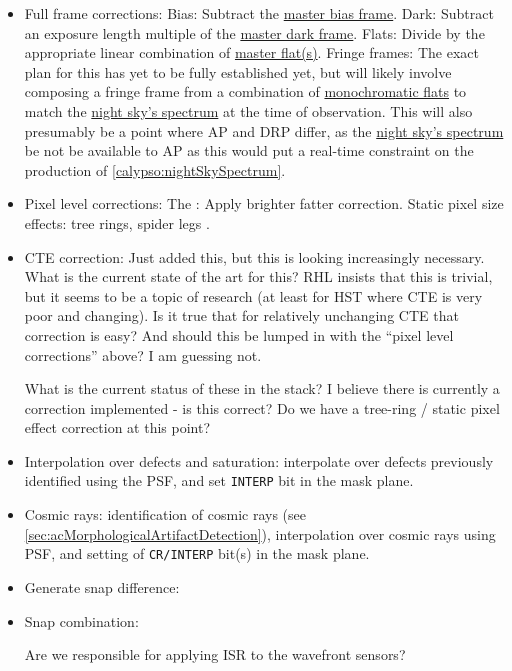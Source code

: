 \begin{itemize}
\item Full frame corrections:
	\subitem Bias: Subtract the \hyperref[calibProducts:bias]{master bias frame}.
	\subitem Dark: Subtract an exposure length multiple of the \hyperref[calibProducts:dark]{master dark frame}.
	\subitem Flats: Divide by the appropriate linear combination of  \hyperref[calibProducts:monoPhotoFlat]{master flat(s)}.
	\subitem Fringe frames: The exact plan for this has yet to be fully established yet, but will likely involve composing a fringe frame from a combination of \hyperref[calibProducts:monoFlat]{monochromatic flats} to match the \hyperref[calypso:nightSkySpectrum]{night sky's spectrum} at the time of observation. This will also presumably be a point where AP and DRP differ, as the \hyperref[calypso:nightSkySpectrum]{night sky's spectrum} be not be available to AP as this would put a real-time constraint on the production of \secsymbol\ref{calypso:nightSkySpectrum}.

\item Pixel level corrections:
	\subitem The \bfeffect: Apply brighter fatter correction. 
	\subitem Static pixel size effects: tree rings, spider legs \etc. 

\item CTE correction: Just added this, but this is looking increasingly necessary. What is the current state of the art for this? RHL insists that this is trivial, but it seems to be a topic of research (at least for HST where CTE is very poor and changing). Is it true that for relatively unchanging CTE that correction is easy? And should this be lumped in with the ``pixel level corrections'' above? I am guessing not.

\begin{note}
	What is the current status of these in the stack? I believe there is currently a \bfeffect correction implemented - is this correct? Do we have a tree-ring / static pixel effect correction at this point? 
\end{note}

\item Interpolation over defects and saturation: interpolate over defects previously identified using the PSF, and set \texttt{INTERP} bit in the mask plane.

\item Cosmic rays: identification of cosmic rays (see \secsymbol\ref{sec:acMorphologicalArtifactDetection}), interpolation over cosmic rays using PSF, and setting of \texttt{CR/INTERP} bit(s) in the mask plane.

\item Generate snap difference: 

\item Snap combination: 

\begin{note}
	Are we responsible for applying ISR to the wavefront sensors?
\end{note}
\end{itemize}

